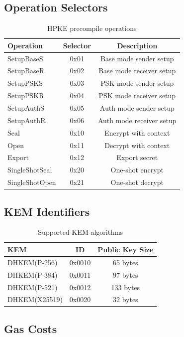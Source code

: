 \documentclass[11pt,a4paper]{article}
\theoremstyle{definition}
\begin{document}
\subsection{Operation Selectors}

\begin{table}[h]
\centering
\begin{tabular}{lcc}
\toprule
Operation & Selector & Description \\
\midrule
SetupBaseS & 0x01 & Base mode sender setup \\
SetupBaseR & 0x02 & Base mode receiver setup \\
SetupPSKS & 0x03 & PSK mode sender setup \\
SetupPSKR & 0x04 & PSK mode receiver setup \\
SetupAuthS & 0x05 & Auth mode sender setup \\
SetupAuthR & 0x06 & Auth mode receiver setup \\
Seal & 0x10 & Encrypt with context \\
Open & 0x11 & Decrypt with context \\
Export & 0x12 & Export secret \\
SingleShotSeal & 0x20 & One-shot encrypt \\
SingleShotOpen & 0x21 & One-shot decrypt \\
\bottomrule
\end{tabular}
\caption{HPKE precompile operations}
\end{table}

\subsection{KEM Identifiers}

\begin{table}[h]
\centering
\begin{tabular}{lcc}
\toprule
KEM & ID & Public Key Size \\
\midrule
DHKEM(P-256) & 0x0010 & 65 bytes \\
DHKEM(P-384) & 0x0011 & 97 bytes \\
DHKEM(P-521) & 0x0012 & 133 bytes \\
DHKEM(X25519) & 0x0020 & 32 bytes \\
\bottomrule
\end{tabular}
\caption{Supported KEM algorithms}
\end{table}

\subsection{Gas Costs}
\end{document}
